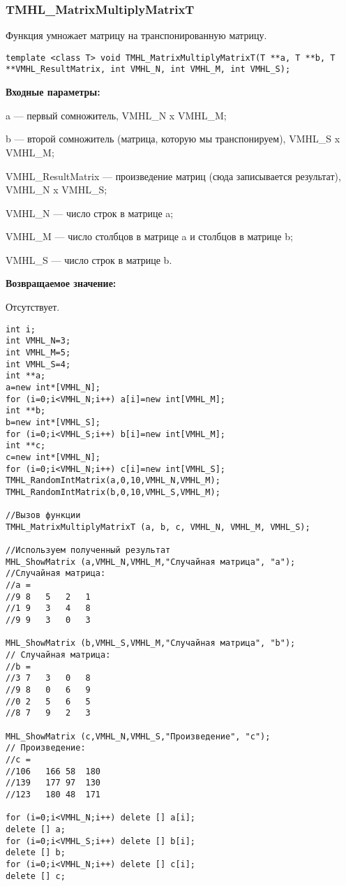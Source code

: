 \documentclass[a4paper,12pt]{article}
\begin{document}
\subsubsection{TMHL\_MatrixMultiplyMatrixT}\label{TMHL_MatrixMultiplyMatrixT}

Функция умножает матрицу на транспонированную матрицу.


\begin{lstlisting}[label=code_syntax_TMHL_MatrixMultiplyMatrixT,caption=Синтаксис]
template <class T> void TMHL_MatrixMultiplyMatrixT(T **a, T **b, T **VMHL_ResultMatrix, int VMHL_N, int VMHL_M, int VMHL_S);
\end{lstlisting}

\textbf{Входные параметры:}
 
a --- первый сомножитель, VMHL\_N x VMHL\_M;
 
b --- второй сомножитель (матрица, которую мы транспонируем), VMHL\_S x VMHL\_M;
 
VMHL\_ResultMatrix --- произведение матриц (сюда записывается результат), VMHL\_N x VMHL\_S;
 
VMHL\_N --- число строк в матрице a;
 
VMHL\_M --- число столбцов в матрице a и столбцов в матрице b;
 
VMHL\_S --- число строк в матрице b.

\textbf{Возвращаемое значение:}

Отсутствует.


\begin{lstlisting}[label=code_use_TMHL_MatrixMultiplyMatrixT,caption=Пример использования]
int i;
int VMHL_N=3;
int VMHL_M=5;
int VMHL_S=4;
int **a;
a=new int*[VMHL_N];
for (i=0;i<VMHL_N;i++) a[i]=new int[VMHL_M];
int **b;
b=new int*[VMHL_S];
for (i=0;i<VMHL_S;i++) b[i]=new int[VMHL_M];
int **c;
c=new int*[VMHL_N];
for (i=0;i<VMHL_N;i++) c[i]=new int[VMHL_S];
TMHL_RandomIntMatrix(a,0,10,VMHL_N,VMHL_M);
TMHL_RandomIntMatrix(b,0,10,VMHL_S,VMHL_M);

//Вызов функции
TMHL_MatrixMultiplyMatrixT (a, b, c, VMHL_N, VMHL_M, VMHL_S);

//Используем полученный результат
MHL_ShowMatrix (a,VMHL_N,VMHL_M,"Случайная матрица", "a");
//Случайная матрица:
//a =
//9	8	5	2	1
//1	9	3	4	8
//9	9	3	0	3

MHL_ShowMatrix (b,VMHL_S,VMHL_M,"Случайная матрица", "b");
// Случайная матрица:
//b =
//3	7	3	0	8
//9	8	0	6	9
//0	2	5	6	5
//8	7	9	2	3

MHL_ShowMatrix (c,VMHL_N,VMHL_S,"Произведение", "c");
// Произведение:
//c =
//106	166	58	180
//139	177	97	130
//123	180	48	171

for (i=0;i<VMHL_N;i++) delete [] a[i];
delete [] a;
for (i=0;i<VMHL_S;i++) delete [] b[i];
delete [] b;
for (i=0;i<VMHL_N;i++) delete [] c[i];
delete [] c;
\end{lstlisting}
\end{document}
